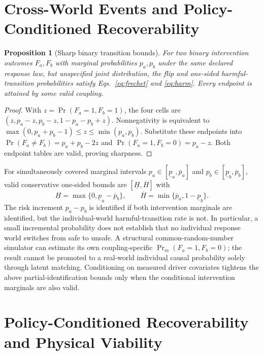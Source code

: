 \documentclass[10pt]{article}
\newtheorem{proposition}{Proposition}\newtheorem{assumption}{Assumption}\newtheorem{remark}{Remark}
\begin{document}
\section{Cross-World Events and Policy-Conditioned Recoverability}
\label{app:identification}
\begin{proposition}[Sharp binary transition bounds]\label{prop:frechet}
For two binary intervention outcomes $F_a,F_b$ with marginal probabilities $p_a,p_b$ under the same declared response law, but unspecified joint distribution, the flip and one-sided harmful-transition probabilities satisfy Eqs.~\eqref{eq:frechet} and \eqref{eq:harm}. Every endpoint is attained by some valid coupling.
\end{proposition}
\begin{proof}
With $z=\Pr(F_a=1,F_b=1)$, the four cells are $(z,p_a-z,p_b-z,1-p_a-p_b+z)$. Nonnegativity is equivalent to $\max(0,p_a+p_b-1)\le z\le\min(p_a,p_b)$. Substitute these endpoints into $\Pr(F_a\ne F_b)=p_a+p_b-2z$ and $\Pr(F_a=1,F_b=0)=p_a-z$. Both endpoint tables are valid, proving sharpness.
\end{proof}
For simultaneously covered marginal intervals $p_a\in[\underline p_a,\overline p_a]$ and $p_b\in[\underline p_b,\overline p_b]$, valid conservative one-sided bounds are $[\underline H,\overline H]$ with
\begin{equation}
 \underline H=\max\{0,\underline p_a-\overline p_b\},\qquad
 \overline H=\min\{\overline p_a,1-\underline p_b\}.
 \label{eq:uncertainharm}
\end{equation}
The risk increment $p_a-p_b$ is identified if both intervention marginals are identified, but the individual-world harmful-transition rate is not. In particular, a small incremental probability does not establish that no individual response world switches from safe to unsafe. A structural common-random-number simulator can estimate its own coupling-specific $\Pr_m(F_a=1,F_b=0)$; the result cannot be promoted to a real-world individual causal probability solely through latent matching. Conditioning on measured driver covariates tightens the above partial-identification bounds only when the conditional intervention marginals are also valid.

\section{Policy-Conditioned Recoverability and Physical Viability}
\label{app:recovery}
\end{document}

